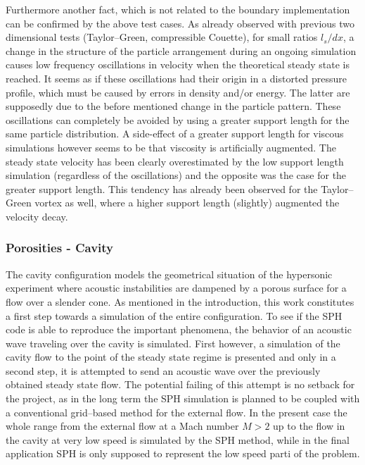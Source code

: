 \documentclass{report}
\begin{document}
Furthermore another fact, which is not related to the boundary implementation can be confirmed by the above test cases. As already observed with previous two dimensional tests (Taylor--Green, compressible Couette), for small ratios $l_s/dx$, a change in the structure of the particle arrangement during an ongoing simulation causes low frequency oscillations in velocity when the theoretical steady state is reached. It seems as if these oscillations had their origin in a distorted pressure profile, which must be caused by errors in density and/or energy. The latter are supposedly due to the before mentioned change in the particle pattern. 
These oscillations can completely be avoided by using a greater support length for the same particle distribution. A side-effect of a greater support length for viscous simulations however seems to be that viscosity is artificially augmented. The steady state velocity has been clearly overestimated by the low support length simulation (regardless of the oscillations) and the opposite was the case for the greater support length. This tendency has already been observed for the Taylor--Green vortex as well, where a higher support length (slightly) augmented the velocity decay.

\subsubsection{Porosities - Cavity}
The cavity configuration models the geometrical situation of the hypersonic experiment where acoustic instabilities are dampened by a porous surface for a flow over a slender cone. As mentioned in the introduction, this work constitutes a first step towards a simulation of the entire configuration. To see if the SPH code is able to reproduce the important phenomena, the behavior of an acoustic wave traveling over the cavity is simulated. First however, a simulation of the cavity flow to the point of the steady state regime is presented and only in a second step, it is attempted to send an acoustic wave over the previously obtained steady state flow. 
The potential failing of this attempt is no setback for the project, as in the long term the SPH simulation is planned to be coupled with a conventional grid--based method for the external flow. In the present case the whole range from the external flow at a Mach number $M>2$ up to the flow in the cavity at very low speed is simulated by the SPH method, while in the final application SPH is only supposed to represent the low speed parti of the problem. 
\end{document}
